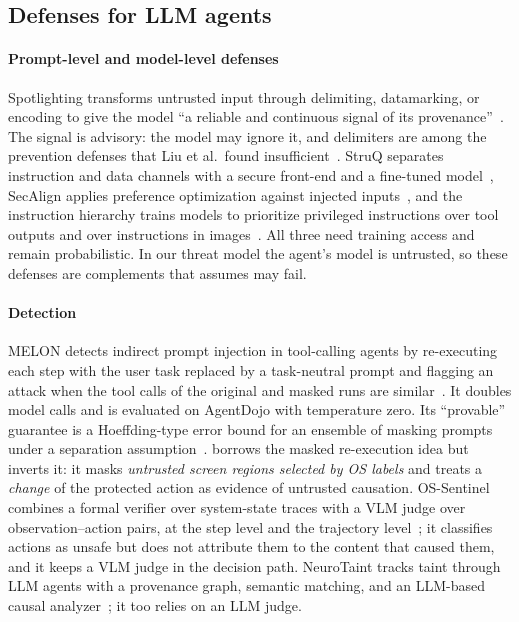 \subsection{Defenses for LLM agents}\label{sec:rw-defenses}

\paragraph{Prompt-level and model-level defenses}
Spotlighting transforms untrusted input through delimiting, datamarking, or encoding to give the model ``a reliable and continuous signal of its provenance''~\cite{hines2024spotlighting}. The signal is advisory: the model may ignore it, and delimiters are among the prevention defenses that Liu et al.\ found insufficient~\cite{liu2024formalizing}. StruQ separates instruction and data channels with a secure front-end and a fine-tuned model~\cite{chen2025struq}, SecAlign applies preference optimization against injected inputs~\cite{chen2025secalign}, and the instruction hierarchy trains models to prioritize privileged instructions over tool outputs and over instructions in images~\cite{wallace2024instruction}. All three need training access and remain probabilistic. In our threat model the agent's model is untrusted, so these defenses are complements that \PG{} assumes may fail.

\paragraph{Detection}
MELON detects indirect prompt injection in tool-calling agents by re-executing each step with the user task replaced by a task-neutral prompt and flagging an attack when the tool calls of the original and masked runs are similar~\cite{zhu2025melon}. It doubles model calls and is evaluated on AgentDojo with temperature zero. Its ``provable'' guarantee is a Hoeffding-type error bound for an ensemble of masking prompts under a separation assumption~\cite{zhu2025melon}. \PG{} borrows the masked re-execution idea but inverts it: it masks \emph{untrusted screen regions selected by OS labels} and treats a \emph{change} of the protected action as evidence of untrusted causation. OS-Sentinel combines a formal verifier over system-state traces with a VLM judge over observation--action pairs, at the step level and the trajectory level~\cite{sun2026ossentinel}; it classifies actions as unsafe but does not attribute them to the content that caused them, and it keeps a VLM judge in the decision path. NeuroTaint tracks taint through LLM agents with a provenance graph, semantic matching, and an LLM-based causal analyzer~\cite{cai2026neurotaint}; it too relies on an LLM judge.

